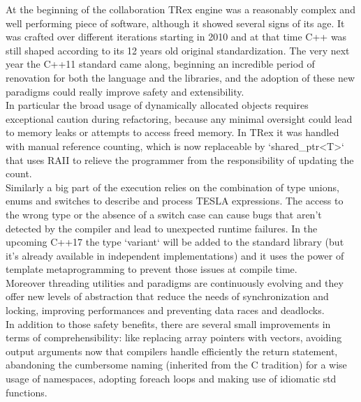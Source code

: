 At the beginning of the collaboration TRex engine was a reasonably complex and well performing piece of software, although it showed several signs of its age. It was crafted over different iterations starting in 2010 and at that time C++ was still shaped according to its 12 years old original standardization. The very next year the C++11 standard came along, beginning an incredible period of renovation for both the language and the libraries, and the adoption of these new paradigms could really improve safety and extensibility.\\
In particular the broad usage of dynamically allocated objects requires exceptional caution during refactoring, because any minimal oversight could lead to memory leaks or attempts to access freed memory. In TRex it was handled with manual reference counting, which is now replaceable by `shared_ptr<T>` that uses RAII to relieve the programmer from the responsibility of updating the count.\\
Similarly a big part of the execution relies on the combination of type unions, enums and switches to describe and process TESLA expressions. The access to the wrong type or the absence of a switch case can cause bugs that aren't detected by the compiler and lead to unexpected runtime failures. In the upcoming C++17 the type `variant` will be added to the standard library (but it's already available in independent implementations) and it uses the power of template metaprogramming to prevent those issues at compile time.\\
Moreover threading utilities and paradigms are continuously evolving and they offer new levels of abstraction that reduce the needs of synchronization and locking, improving performances and preventing data races and deadlocks.\\
In addition to those safety benefits, there are several small improvements in terms of comprehensibility: like replacing array pointers with vectors, avoiding output arguments now that compilers handle efficiently the return statement, abandoning the cumbersome naming (inherited from the C tradition) for a wise usage of namespaces, adopting foreach loops and making use of idiomatic std functions.

